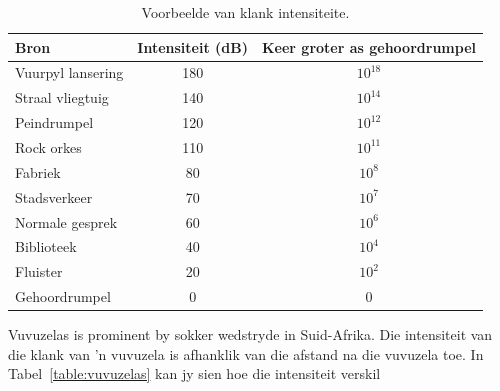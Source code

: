\begin{table}[H]
\begin{center}
\begin{tabular}{|l|c|c|}\hline
\textbf{Bron}&\textbf{Intensiteit} (dB) & \textbf{Keer groter as gehoordrumpel}\\\hline
Vuurpyl lansering &180 & $10^{18}$\\
Straal vliegtuig & 140 & $10^{14}$ \\
Peindrumpel & 120 & $10^{12}$\\
Rock orkes & 110 & $10^{11}$\\
Fabriek & 80 & $10^{8}$\\
Stadsverkeer & 70 & $10^{7}$\\
Normale gesprek & 60 & $10^{6}$\\
Biblioteek & 40 & $10^{4}$\\
Fluister & 20 & $10^{2}$\\
Gehoordrumpel & 0 & 0\\
\hline
\end{tabular}
\end{center}
\caption{Voorbeelde van klank intensiteite.}
\label{p:wsl:s11:intensity}
\end{table}

Vuvuzelas is prominent by sokker wedstryde in Suid-Afrika. Die intensiteit van die klank van  'n vuvuzela is afhanklik van die afstand na die vuvuzela toe. In Tabel~\ref{table:vuvuzelas} kan jy sien hoe die intensiteit verskil

